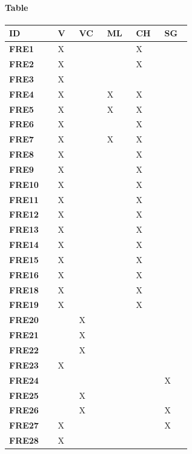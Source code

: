 \paragraph{Table}
\begin{longtable}
{| p{0.10\linewidth} |P{0.05\linewidth} | P{0.05\linewidth} | P{0.05\linewidth} | P{0.05\linewidth} | P{0.05\linewidth} |}
    \hline
    \textbf{ID} & \textbf{V} & \textbf{VC}& \textbf{ML} & \textbf{CH}  & \textbf{SG} \T\B \\
    \hline 
    \hline
    \textbf{FRE1} & X & & &X &\T\B\\
    \hline
    \textbf{FRE2} & X & & &X &\T\B\\
    \hline
    \textbf{FRE3} & X & & & &\T\B\\
    \hline
    \textbf{FRE4} & X & &X &X &\T\B\\
    \hline
    \textbf{FRE5} & X & &X &X &\T\B\\
    \hline
    \textbf{FRE6} & X & & &X &\T\B\\
    \hline
    \textbf{FRE7} & X & &X &X &\T\B\\
    \hline
    \textbf{FRE8} & X & & &X &\T\B\\
    \hline
    \textbf{FRE9} & X & & &X &\T\B\\
    \hline
    \textbf{FRE10} & X & & &X &\T\B\\
    \hline
    \textbf{FRE11} & X & & &X &\T\B\\
    \hline
    \textbf{FRE12} & X & & &X &\T\B\\
    \hline
    \textbf{FRE13} & X & & &X &\T\B\\
    \hline
    \textbf{FRE14} & X & & &X &\T\B\\
    \hline
    \textbf{FRE15} & X & & &X &\T\B\\
    \hline
    \textbf{FRE16} & X & & &X &\T\B\\
    \hline
    \textbf{FRE18} & X & & &X &\T\B\\
    \hline
    \textbf{FRE19} & X & & &X &\T\B\\
    \hline
    \textbf{FRE20} &  &X & & &\T\B\\
    \hline
    \textbf{FRE21} &  &X & & &\T\B\\
    \hline
    \textbf{FRE22} &  &X & & &\T\B\\
    \hline
    \textbf{FRE23} &X & & & &\T\B\\
    \hline
    \textbf{FRE24} &  & & & &X\T\B\\
    \hline
    \textbf{FRE25} &  &X & & &\T\B\\
    \hline
    \textbf{FRE26} &  &X & & &X\T\B\\
    \hline
    \textbf{FRE27} &X  & & & &X\T\B\\
    \hline
    \textbf{FRE28} &X  & & & &\T\B\\
    \hline
\end{longtable}
\label{subsec:mappingOnMobileApplication}
